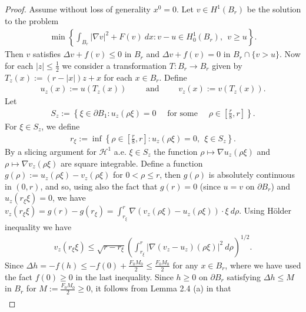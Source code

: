 \documentclass[11pt,reqno]{amsart}
\begin{document}
\begin{proof}
	Assume without loss of generality $x^{0}=0$. Let $v\in H^{1}(B_{r})$ be the solution to the problem
	\begin{align*}
		\min\left\lbrace\int_{B_{r}}|\nabla v|^{2}+F(v)\:dx\colon v-u\in H_{0}^{1}(B_{r}),\ \ v\geqslant u\right\rbrace.
	\end{align*}
    Then $v$ satisfies $\Delta v+f(v)\leqslant0$ in $B_{r}$ and $\Delta v+f(v)=0$ in $B_{r}\cap\{v>u\}$. Now for each $|z|\leqslant\frac{1}{2}$ we consider a transformation $T\colon B_{r}\to B_{r}$ given by $T_{z}(x):=(r-|x|)z+x$ for each $x\in B_{r}$. Define
    \begin{align*}
    	u_{z}(x):=u(T_{z}(x))\qquad\text{ and }\qquad v_{z}(x):=v(T_{z}(x)).
    \end{align*}
    Let
    \begin{align*}
    	S_{z}:=\left\lbrace\xi\in\partial B_{1}\colon u_{z}(\rho\xi)=0\quad\text{ for some }\quad\rho\in\left[\frac{r}{8},r\right]\right\rbrace.
    \end{align*}
    For $\xi\in S_{z}$, we define
    \begin{align*}
    	r_{\xi}:=\inf\left\lbrace\rho\in\left[\frac{r}{8},r\right]\colon u_{z}(\rho\xi)=0,\ \ \xi\in S_{z}\right\rbrace.
    \end{align*}
    By a slicing argument for $\mathcal{H}^{1}$ a.e. $\xi\in S_{z}$ the function $\rho\mapsto\nabla u_{z}(\rho\xi)$ and $\rho\mapsto\nabla v_{z}(\rho\xi)$ are square integrable. Define a function $g(\rho):=u_{z}(\rho\xi)-v_{z}(\rho\xi)$ for $0<\rho\leqslant r$, then $g(\rho)$ is absolutely continuous in $(0,r)$, and so, using also the fact that $g(r)=0$ (since $u=v$ on $\partial B_{r}$) and $u_{z}(r_{\xi}\xi)=0$, we have $v_{z}(r_{\xi}\xi)=g(r)-g(r_{\xi})=\int_{r_{\xi}}^{r}\nabla(v_{z}(\rho\xi)-u_{z}(\rho\xi))\cdot\xi\:d\rho$. Using H\"{o}lder inequality we have
    \begin{align}\label{Formula: P(5)}
    	v_{z}(r_{\xi}\xi)\leqslant\sqrt{r-r_{\xi}}\left(\int_{r_{\xi}}^{r}|\nabla(v_{z}-u_{z})(\rho\xi)|^{2}\:d\rho\right)^{1/2}.
    \end{align}
    Since $\Delta h=-f(h)\leqslant-f(0)+\frac{F_{0}M_{0}}{2}\leqslant\frac{F_{0}M_{0}}{2}$ for any $x\in B_{r}$, where we have used the fact $f(0)\geqslant0$ in the last inequality. Since $h\geqslant0$ on $\partial B_{r}$ satisfying $\Delta h\leqslant M$ in $B_{r}$ for $M:=\frac{F_{0}M_{0}}{2}\geqslant0$, it follows from Lemma 2.4 (a) in \cite{GS1996} that
    \begin{align*}

\end{align*}
\end{proof}
\end{document}
